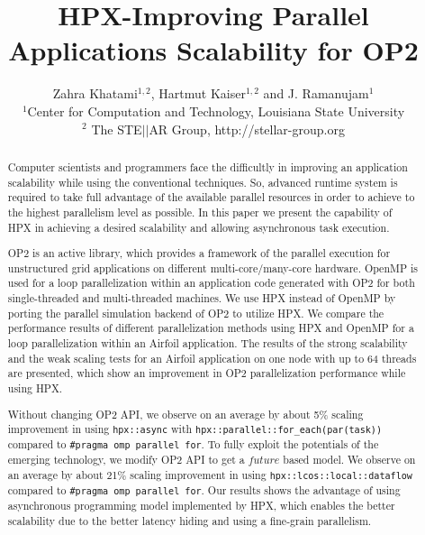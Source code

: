 \documentclass[conference]{IEEEtran}
\begin{document}





%

\title{HPX-Improving Parallel Applications Scalability for OP2}
\author{Zahra Khatami$^{1,2}$, Hartmut Kaiser$^{1,2}$ and J. Ramanujam$^{1}$ \\$^{1}$Center for Computation and Technology, Louisiana State University\\$^{2}$ The STE$||$AR Group, http://stellar-group.org
}
   
\maketitle

\begin{abstract}

Computer scientists and programmers face the difficultly in improving an application scalability while using the conventional techniques. So, advanced runtime system is required to take full advantage of the available parallel resources in order to achieve to the highest parallelism level as possible. In this paper we present the capability of HPX in achieving a desired scalability and allowing asynchronous task execution.

OP2 is an active library, which provides a framework of the parallel execution for unstructured grid applications on different multi-core/many-core hardware.  OpenMP is used for a loop parallelization within an application code generated with OP2 for both single-threaded and multi-threaded machines. We use HPX instead of OpenMP by porting the parallel simulation backend of OP2 to utilize HPX. We compare the performance results of different parallelization methods using HPX and OpenMP for a loop parallelization within an Airfoil application. The results of the strong scalability and the weak scaling tests for an Airfoil application on one node with up to 64 threads are presented, which show an improvement in OP2 parallelization performance while using HPX. 

Without changing OP2 API, we observe on an average by about 5\% scaling improvement in using \texttt{hpx::async} with \texttt{hpx::parallel::for\_each(par(task))} compared to \texttt{\#pragma omp parallel for}. To fully exploit the potentials of the emerging technology, we modify OP2 API to get a $future$ based model. We observe on an average by about 21\% scaling improvement in using \texttt{hpx::lcos::local::dataflow} compared to \texttt{\#pragma omp parallel for}. Our results shows the advantage of using asynchronous programming model implemented by HPX, which enables the better scalability due to the better latency hiding and using a fine-grain parallelism.




\end{abstract}
\end{document}
